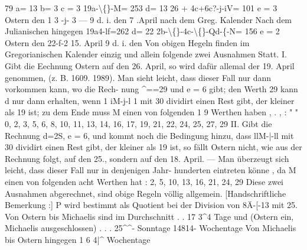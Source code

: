 \documentclass[12pt,a4paper]{article}
\begin{document}
\newpage

79
a=  13
b=  3
c  =    3
19a-\textbackslash\{\}-M=  253
d=  13
26  +  4c+6c?-j-iV=  101
e  =  3
Ostern  den  1 3  -j-  3  ---  9  d.  i.  den  7  .April
nach  dem  Greg.  Kalender
Nach  dem  Julianischen  hingegen
19a4-lf=262
d=  22
2b-\textbackslash\{\}-4c-\textbackslash\{\}-Qd-\{-N=  156
e  =  2
Ostern  den    22-f-2
15.  April
9    d.  i.  den
Von  obigen  Hegeln  finden  im  Gregorianischen  Kalender  einzig  und  allein
folgende  zwei  Ausnahmen  Statt.
I.  Gibt  die  Eechnung  Ostern  auf  den  26.  April,  so  wird  dafür  allemal  der
19.  April  genommen,     (z.  B.  1609.  1989).
Man  sieht  leicht,  dass  dieser  Fall  nur  dann  vorkommen  kann,  wo  die  Rech-
nung \^{}==29  und  e  =  6  gibt;  den  Werth  29  kann  d  nur  dann  erhalten,  wenn
1  iM-j-l  1  mit  30  dividirt  einen  Rest  gibt,  der  kleiner  als  19  ist;  zu  dem  Ende
muss  M  einen  von  folgenden  1 9  Werthen  haben  ,  .  , :     "  "
0,  2,  3,  5,  6,  8,  10,  11,  13,  14,  16,  17,  19,  21,  22,  24,  25,  27,  29
II.  Gibt  die  Rechnung  d=2S,  e  =  6,  und  kommt  noch  die  Bedingung
hinzu,  dass  llM-|-ll  mit  30  dividirt  einen  Rest  gibt,  der  kleiner  als  19  ist,
so  fällt  Ostern  nicht,  wie  aus  der  Rechnung  folgt,  auf  den  25.,  sondern  auf  den
18.  April.  ---  Man  überzeugt  sich  leicht,  dass  dieser  Fall  nur  in  denjenigen  Jahr-
hunderten eintreten  könne ,  da  M  einen  von  folgenden  acht  Werthen  hat  :
2,  5,  10,  13,  16,  21,  24,  29
Diese  zwei  Ausnahmen  abgerechnet,  sind  obige  Regeln  völlig  allgemein.
[Handschriftliche  Bemerkung :]
P  wird  bestimmt  als  Quotient  bei  der  Division  von    8Ä-[-13  mit  25.
Von  Ostern  bis  Michaelis  sind  im  Durchschnitt  .     .     17  3\^{}4  Tage
und  (Ostern  ein,  Michaelis  ausgeschlossen)     .     .     .        25\^{}\^{}-  Sonntage
14814-  Wochentage
Von  Michaelis  bis  Ostern  hingegen
1 6 4|\^{}  Wochentage

\newpage
\end{document}
